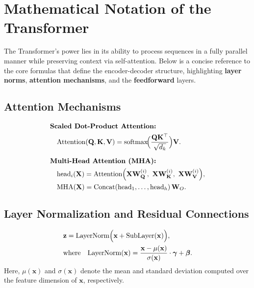 \section{Mathematical Notation of the Transformer}
\label{sec:transformer_notation}

\noindent
The Transformer's power lies in its ability to process sequences in a fully parallel manner while preserving context via self-attention. Below is a concise reference to the core formulas that define the encoder-decoder structure, highlighting \textbf{layer norms}, \textbf{attention mechanisms}, and the \textbf{feedforward} layers.

\subsection{Attention Mechanisms}
\begin{align}
&\textbf{Scaled Dot-Product Attention:}\notag\\
&\quad \text{Attention}(\mathbf{Q}, \mathbf{K}, \mathbf{V}) 
= \text{softmax}\!\Bigl(\frac{\mathbf{Q} \mathbf{K}^\top}{\sqrt{d_k}}\Bigr) \mathbf{V}. \label{eq:attention} \\[6pt]
&\textbf{Multi-Head Attention (MHA):}\notag\\
&\quad
\text{head}_i(\mathbf{X}) 
= 
\text{Attention}\Bigl(
\mathbf{X}\mathbf{W}_\mathbf{Q}^{(i)},\ 
\mathbf{X}\mathbf{W}_\mathbf{K}^{(i)},\ 
\mathbf{X}\mathbf{W}_\mathbf{V}^{(i)}
\Bigr), \label{eq:mha_head} \\
&\quad 
\text{MHA}(\mathbf{X}) 
= 
\text{Concat}(\text{head}_1, \ldots, \text{head}_h)\,\mathbf{W}_O. \label{eq:mha_final}
\end{align}

\subsection{Layer Normalization and Residual Connections}
\begin{align*}
&\mathbf{z} = \text{LayerNorm}\Bigl(\mathbf{x} + \text{SubLayer}(\mathbf{x})\Bigr), \\
&\text{where} \quad
\text{LayerNorm}(\mathbf{x}) 
= 
\frac{\mathbf{x} - \mu(\mathbf{x})}{\sigma(\mathbf{x})} \cdot \boldsymbol{\gamma} + \boldsymbol{\beta}.
\end{align*}
Here, $\mu(\mathbf{x})$ and $\sigma(\mathbf{x})$ denote the mean and standard deviation computed over the feature dimension of $\mathbf{x}$, respectively.

